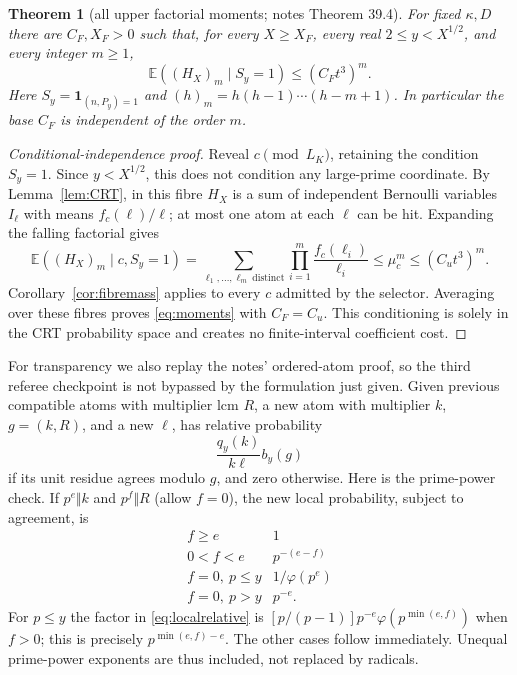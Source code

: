 \documentclass[10pt,reqno]{amsart}
\newtheorem{theorem}{Theorem}[section]
\theoremstyle{remark}
\newcommand{\E}{\mathbb E}
\newcommand{\ind}{\mathbf1}
\begin{document}
\begin{theorem}[all upper factorial moments; notes Theorem 39.4]\label{thm:moments}
For fixed $\kappa,D$ there are $C_F,X_F>0$ such that, for every
$X\geq X_F$, every real $2\leq y<X^{1/2}$, and \emph{every} integer
$m\geq1$,
\begin{equation}\label{eq:moments}
 \E((H_X)_m\mid S_y=1)\leq(C_Ft^3)^m.
\end{equation}
Here $S_y=\ind_{(n,P_y)=1}$ and $(h)_m=h(h-1)\cdots(h-m+1)$.
In particular the base $C_F$ is independent of the order $m$.
\end{theorem}
\begin{proof}[Conditional-independence proof]
Reveal $c\pmod{L_K}$, retaining the condition $S_y=1$.
Since $y<X^{1/2}$, this does not condition any large-prime coordinate.
By Lemma~\ref{lem:CRT}, in this fibre $H_X$ is a sum of independent
Bernoulli variables $I_\ell$ with means $f_c(\ell)/\ell$; at most one
atom at each $\ell$ can be hit.  Expanding the falling factorial gives
\[
 \E((H_X)_m\mid c,S_y=1)
 =\sum_{\ell_1,\ldots,\ell_m\ \mathrm{distinct}}
                 \prod_{i=1}^m\frac{f_c(\ell_i)}{\ell_i}
 \leq\mu_c^m\leq(C_ut^3)^m.
\]
Corollary~\ref{cor:fibremass} applies to every $c$ admitted by the selector.
Averaging over these fibres proves \eqref{eq:moments} with $C_F=C_u$.
This conditioning is solely in the CRT probability space and creates
no finite-interval coefficient cost.
\end{proof}

For transparency we also replay the notes' ordered-atom proof, so the
third referee checkpoint is not bypassed by the formulation just given.
Given previous compatible atoms with multiplier lcm $R$, a new atom with
multiplier $k$, $g=(k,R)$, and a new $\ell$, has relative probability
\begin{equation}\label{eq:localrelative}
 \frac{q_y(k)}{k\ell}b_y(g)
\end{equation}
if its unit residue agrees modulo $g$, and zero otherwise.  Here is the
prime-power check.  If $p^e\Vert k$ and $p^f\Vert R$ (allow $f=0$),
the new local probability, subject to agreement, is
\[
\begin{array}{c|c}
 f\geq e&1\\
 0<f<e&p^{-(e-f)}\\
 f=0,\ p\leq y&1/\varphi(p^e)\\
 f=0,\ p>y&p^{-e}.
\end{array}
\]
For $p\leq y$ the factor in \eqref{eq:localrelative} is
$[p/(p-1)]p^{-e}\varphi(p^{\min(e,f)})$ when $f>0$;
this is precisely $p^{\min(e,f)-e}$.  The other cases follow immediately.
Unequal prime-power exponents are thus included, not replaced by radicals.
\end{document}
